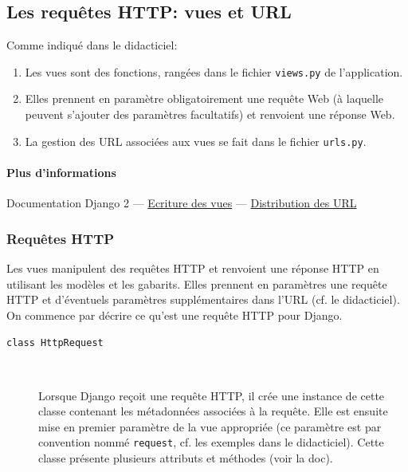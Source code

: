 \documentclass[a4paper, 10pt]{article}
\begin{document}
{\subsection{Les requêtes HTTP: vues et URL}
Comme indiqué dans le didacticiel:
\begin{enumerate}
    \item Les vues sont des fonctions, rangées dans le fichier \texttt{views.py} de l'application.
    \item Elles prennent en paramètre obligatoirement une requête Web (à laquelle peuvent s'ajouter des paramètres facultatifs) et renvoient une réponse Web.
    \item La gestion des URL associées aux vues se fait dans le fichier \texttt{urls.py}.
\end{enumerate}

\paragraph{Plus d'informations} Documentation Django 2 --- \href{https://docs.djangoproject.com/fr/2.0/topics/http/views/}{Ecriture des vues} ---  \href{https://docs.djangoproject.com/fr/2.0/topics/http/urls/}{Distribution des URL}

\subsubsection{Requêtes HTTP}
Les  vues manipulent des requêtes HTTP et renvoient une réponse HTTP en utilisant les modèles et les gabarits. Elles prennent en paramètres une requête HTTP et d'éventuels paramètres supplémentaires dans l'URL (cf. le didacticiel). On commence par décrire ce qu'est une requête HTTP pour Django.

\begin{description}
    \item[\texttt{class HttpRequest}]~

    Lorsque Django reçoit une requête HTTP, il crée une instance de cette classe contenant les métadonnées associées à la requête. Elle est ensuite mise en premier paramètre de la vue appropriée (ce paramètre est par convention nommé \texttt{request}, cf. les exemples dans le didacticiel). Cette classe présente plusieurs attributs et méthodes (voir la doc).
\end{description}

}
\end{document}
